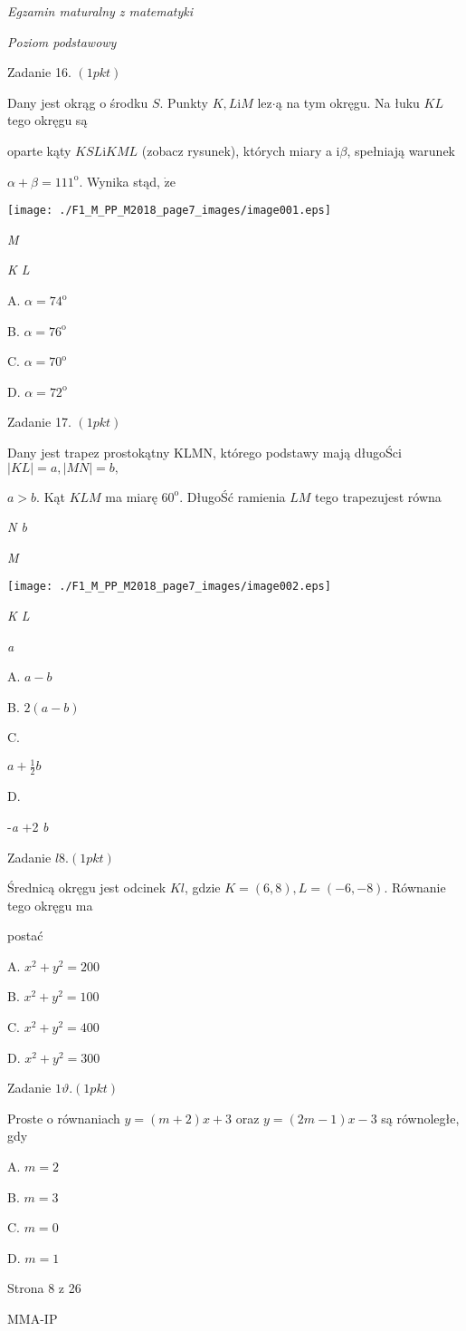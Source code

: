 \documentclass[a4paper,12pt]{article}
\begin{document}
{\it Egzamin maturalny z matematyki}

{\it Poziom podstawowy}

Zadanie 16. $(1pkt)$

Dany jest okrąg o środku $S$. Punkty $K, L\mathrm{i}M$ lez$\cdot$ą na tym okręgu. Na łuku $KL$ tego okręgu są

oparte kąty $KSL \mathrm{i} KML$ (zobacz rysunek), których miary a $\mathrm{i} \beta$, spełniają warunek

$\alpha+\beta=111^{\mathrm{o}}$. Wynika stąd, $\dot{\mathrm{z}}\mathrm{e}$
\begin{center}
\texttt{[image: ./F1\_M\_PP\_M2018\_page7\_images/image001.eps]}
\end{center}
{\it M}

{\it K  L}

A. $\alpha=74^{\mathrm{o}}$

B. $\alpha=76^{\mathrm{o}}$

C. $\alpha=70^{\mathrm{o}}$

D. $\alpha=72^{\mathrm{o}}$

Zadanie 17. $(1pkt)$

Dany jest trapez prostokątny KLMN, którego podstawy mają długoŚci $|KL|=a, |MN|=b,$

$a>b$. Kąt $KLM$ ma miarę $60^{\mathrm{o}}$. DługoŚć ramienia $LM$ tego trapezujest równa

{\it N b}

{\it M}
\begin{center}
\texttt{[image: ./F1\_M\_PP\_M2018\_page7\_images/image002.eps]}
\end{center}
{\it K  L}

{\it a}

A. $a-b$

B. $2(a-b)$

C.

$a+\displaystyle \frac{1}{2}b$

D.

-{\it a} $+$2 {\it b}

Zadanie $l8.(1pkt)$

Średnicą okręgu jest odcinek $Kl$, gdzie $K=(6,8), L=(-6,-8)$. Równanie tego okręgu ma

postać

A. $x^{2}+y^{2}=200$

B. $x^{2}+y^{2}=100$

C. $x^{2}+y^{2}=400$

D. $x^{2}+y^{2}=300$

Zadanie $1\vartheta. (1pkt)$

Proste o równaniach $y=(m+2)x+3$ oraz $y=(2m-1)x-3$ są równoległe, gdy

A. $m=2$

B. $m=3$

C. $m=0$

D. $m=1$

Strona 8 z 26

MMA-IP
\end{document}
